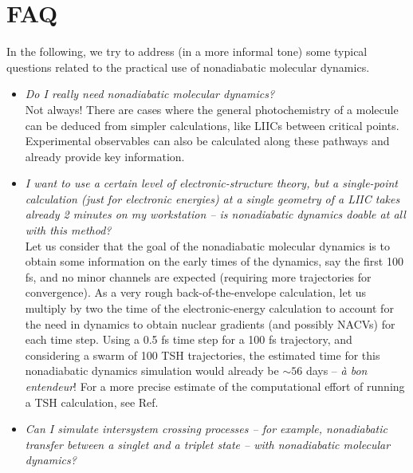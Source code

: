 \documentclass[9pt,bestpractices,pubversion]{livecoms}
\begin{document}
\section{FAQ}
\label{sec:faq}
In the following, we try to address (in a more informal tone) some typical questions related to the practical use of nonadiabatic molecular dynamics. 
\begin{itemize}

\item{\textit{Do I really need nonadiabatic molecular dynamics?} \\
Not always! There are cases where the general photochemistry of a molecule can be deduced from simpler calculations, like LIICs between critical points. Experimental observables can also be calculated along these pathways and already provide key information. 
}
\item{\textit{I want to use a certain level of electronic-structure theory, but a single-point calculation (just for electronic energies) at a single geometry of a LIIC takes already 2 minutes on my workstation -- is nonadiabatic dynamics doable at all with this method?} \\
Let us consider that the goal of the nonadiabatic molecular dynamics is to obtain some information on the early times of the dynamics, say the first 100 fs, and no minor channels are expected (requiring more trajectories for convergence). As a very rough back-of-the-envelope calculation, let us multiply by two the time of the electronic-energy calculation to account for the need in dynamics to obtain nuclear gradients (and possibly NACVs) for each time step. Using a 0.5 fs time step for a 100 fs trajectory, and considering a swarm of 100 TSH trajectories, the estimated time for this nonadiabatic dynamics simulation would already be $\sim56$ days -- \textit{à bon entendeur}! For a more precise estimate of the computational effort of running a TSH calculation, see Ref.~ 
}
\item{\textit{Can I simulate intersystem crossing processes -- for example, nonadiabatic transfer between a singlet and a triplet state -- with nonadiabatic molecular dynamics?} \\
}
\end{itemize}
\end{document}

